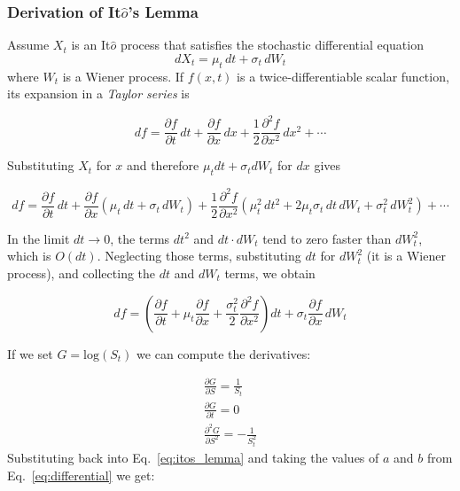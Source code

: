 \begin{attention}
\subsubsection{Derivation of It$\hat{o}$'s Lemma}
Assume $X_t$ is an It$\hat{o}$ process that satisfies the stochastic differential equation
\begin{equation*}	
dX_{t}=\mu_{t}\,dt+\sigma_{t}\,dW_{t}
\end{equation*}
where $W_t$ is a Wiener process. If $f(x, t)$ is a twice-differentiable scalar function, its expansion in a \emph{Taylor series} is
	
\begin{equation*}
df={\frac {\partial f}{\partial t}}\,dt+{\frac {\partial f}{\partial x}}\,dx+{\frac {1}{2}}{\frac {\partial ^{2}f}{\partial x^{2}}}\,dx^{2}+\cdots 
\end{equation*}

Substituting $X_t$ for $x$ and therefore $\mu_t dt + \sigma_t dW_t$ for $dx$ gives
	
\begin{equation*}
df={\frac {\partial f}{\partial t}}\,dt+{\frac {\partial f}{\partial x}}(\mu _{t}\,dt+\sigma _{t}\,dW_{t})+{\frac {1}{2}}{\frac {\partial ^{2}f}{\partial x^{2}}}\left(\mu _{t}^{2}\,dt^{2}+2\mu _{t}\sigma _{t}\,dt\,dW_{t}+\sigma _{t}^{2}\,dW_{t}^{2}\right)+\cdots 
\end{equation*}

In the limit $dt\rightarrow 0$, the terms $dt^2$ and $dt\cdot dW_t$ tend to zero faster than $dW_t^2$, which is $O(dt)$. Neglecting those terms, substituting $dt$ for $dW_t^2$ (it is a Wiener process), and collecting the $dt$ and $dW_t$ terms, we obtain
	
\begin{equation*}
df=\left({\frac {\partial f}{\partial t}}+\mu _{t}{\frac {\partial f}{\partial x}}+{\frac {\sigma _{t}^{2}}{2}}{\frac {\partial ^{2}f}{\partial x^{2}}}\right)dt+\sigma _{t}{\frac {\partial f}{\partial x}}\,dW_{t}
\end{equation*}
\end{attention}
If we set \(G = \textrm{log}(S_t)\) we can compute the derivatives:

\begin{equation}
\begin{gathered}
\frac{\partial G}{\partial S} = \frac{1}{S_t}\\
\frac{\partial G}{\partial t} = 0\\
\frac{\partial^2 G}{\partial S^2} = -\frac{1}{S_t^{2}}
\end{gathered}
\end{equation}
Substituting back into Eq.~\ref{eq:itos_lemma} and taking the values of $a$ and $b$ from Eq.~\ref{eq:differential} we get:

